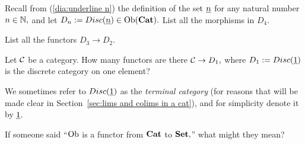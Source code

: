 \documentclass[../main/CT4S-EN-RU]{subfiles}
\begin{document}
\begin{exampleRUS}\label{ex:discrete graph discrete cat}
\end{exampleRUS}

\begin{exerciseENG}
Recall from (\ref{dia:underline n}) the definition of the set $\underline{n}$ for any natural number $n\in{\mathbb N},$ and let $D_n:=Disc(\underline{n})\in\operatorname{Ob}({\mathbf{Cat}}).$
\sexc List all the morphisms in $D_4.$ 
\item List all the functors $D_3\to D_2.$
\endsexc
\end{exerciseENG}

\begin{exerciseRUS}
\end{exerciseRUS}

\begin{exerciseENG}\label{exc:term cat}
Let $\mathcal{C}$ be a category. How many functors are there $\mathcal{C}\rightarrow D_1,$ where $D_1:=Disc(\underline{1})$ is the discrete category on one element?
\end{exerciseENG}

\begin{exerciseRUS}\label{exc:term cat}
\end{exerciseRUS}

\begin{blockENG}
We sometimes refer to $Disc(\underline{1})$ as the {\em terminal category} (for reasons that will be made clear in Section~\ref{sec:lims and colims in a cat}), and for simplicity denote it by $\underline{1}.$
\end{blockENG}

\begin{blockRUS}
\end{blockRUS}

\begin{exerciseENG}\label{exc:Ob is a functor}
If someone said “$\operatorname{Ob}$ is a functor from ${\mathbf{Cat}}$ to ${\mathbf{Set}},$” what might they mean? 
\end{exerciseENG}

\begin{exerciseRUS}\label{exc:Ob is a functor}
\end{exerciseRUS}
\end{document}
